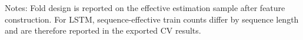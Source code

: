 \begin{table}[htbp]
\begin{tabular}{llp{5.8cm}p{5.6cm}p{2.7cm}}
\bottomrule
\end{tabular}
\begin{tablenotes}
\footnotesize
\item Notes: Fold design is reported on the effective estimation sample after feature construction. 
For LSTM, sequence-effective train counts differ by sequence length and are therefore reported in the exported CV results.
\end{tablenotes}
\end{table}